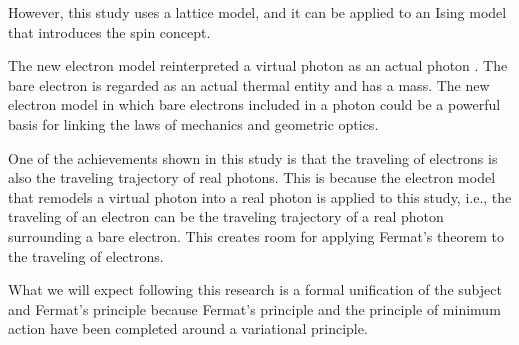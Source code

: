 \documentclass[reprint,amsmath,amssymb,aps,]{revtex4-1}
\numberwithin{equation}{section}%
\begin{document}
    However, this study uses a lattice model, and it can be applied to an Ising model that introduces the spin concept.
    
    The new electron model reinterpreted a virtual photon as an actual photon \cite{Hanamura1}. The bare electron is regarded as an actual thermal entity and has a mass. The new electron model in which bare electrons included in a photon could be a powerful basis for linking the laws of mechanics and geometric optics.
    
    One of the achievements shown in this study is that the traveling of electrons is also the traveling trajectory of real photons. This is because the electron model that remodels a virtual photon into a real photon is applied to this study, i.e., the traveling of an electron can be the traveling trajectory of a real photon surrounding a bare electron. This creates room for applying Fermat's theorem to the traveling of electrons.
    

    What we will expect following this research is a formal unification of the subject and Fermat's principle because Fermat's principle and the principle of minimum action have been completed around a variational principle.

\end{document}
